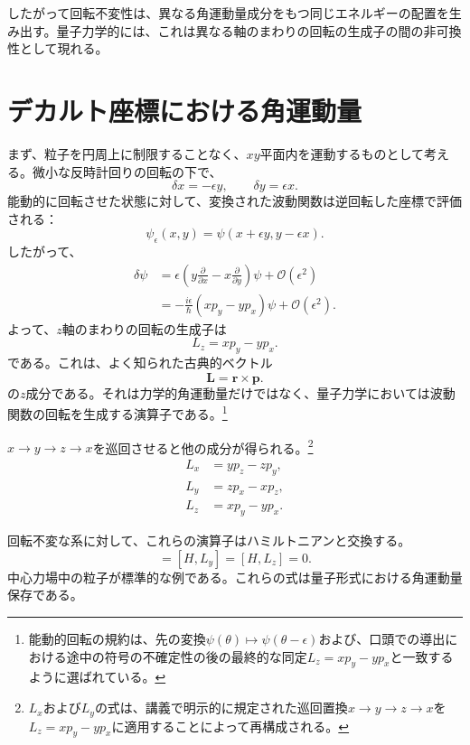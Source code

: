 したがって回転不変性は、異なる角運動量成分をもつ同じエネルギーの配置を生み出す。量子力学的には、これは異なる軸のまわりの回転の生成子の間の非可換性として現れる。

\section{デカルト座標における角運動量}

まず、粒子を円周上に制限することなく、\(xy\)平面内を運動するものとして考える。微小な反時計回りの回転の下で、
\begin{equation}
\delta x=-\epsilon y,
\qquad
\delta y=\epsilon x.
\end{equation}
能動的に回転させた状態に対して、変換された波動関数は逆回転した座標で評価される：
\begin{equation}
\psi_\epsilon(x,y)
=\psi(x+\epsilon y,y-\epsilon x).
\end{equation}
したがって、
\begin{align}
\delta\psi
&=\epsilon\left(
y\frac{\partial}{\partial x}
-x\frac{\partial}{\partial y}
\right)\psi
+\mathcal O(\epsilon^2)\\
&=-\frac{i\epsilon}{\hbar}
\left(xp_y-yp_x\right)\psi
+\mathcal O(\epsilon^2).
\end{align}
よって、\(z\)軸のまわりの回転の生成子は
\begin{equation}
L_z=xp_y-yp_x.
\end{equation}
である。これは、よく知られた古典的ベクトル
\begin{equation}
\mathbf L=\mathbf r\times\mathbf p.
\end{equation}
の\(z\)成分である。それは力学的角運動量だけではなく、量子力学においては波動関数の回転を生成する演算子である。\footnote{能動的回転の規約は、先の変換\(\psi(\theta)\mapsto\psi(\theta-\epsilon)\)および、口頭での導出における途中の符号の不確定性の後の最終的な同定\(L_z=xp_y-yp_x\)と一致するように選ばれている。}

\(x\to y\to z\to x\)を巡回させると他の成分が得られる。\footnote{\(L_x\)および\(L_y\)の式は、講義で明示的に規定された巡回置換\(x\to y\to z\to x\)を\(L_z=xp_y-yp_x\)に適用することによって再構成される。}
\begin{align}
L_x&=yp_z-zp_y,\\
L_y&=zp_x-xp_z,\\
L_z&=xp_y-yp_x.
\end{align}

回転不変な系に対して、これらの演算子はハミルトニアンと交換する。
\begin{equation}
[H,L_x]=[H,L_y]=[H,L_z]=0.
\end{equation}
中心力場中の粒子が標準的な例である。これらの式は量子形式における角運動量保存である。

